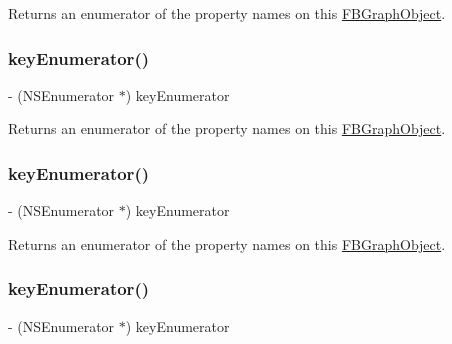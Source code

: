 Returns an enumerator of the property names on this {\ttfamily \hyperlink{interfaceFBGraphObject}{F\+B\+Graph\+Object}}. \mbox{\label{protocolFBGraphObject-p_a8df88c6df762bb207cea390c8ef5d048}} 
\subsubsection{\texorpdfstring{key\+Enumerator()}{keyEnumerator()}\hspace{0.1cm}{\footnotesize\ttfamily [3/5]}}
{\footnotesize\ttfamily -\/ (N\+S\+Enumerator $\ast$) key\+Enumerator \begin{DoxyParamCaption}{ }\end{DoxyParamCaption}}

Returns an enumerator of the property names on this {\ttfamily \hyperlink{interfaceFBGraphObject}{F\+B\+Graph\+Object}}. \mbox{\label{protocolFBGraphObject-p_a8df88c6df762bb207cea390c8ef5d048}} 
\subsubsection{\texorpdfstring{key\+Enumerator()}{keyEnumerator()}\hspace{0.1cm}{\footnotesize\ttfamily [4/5]}}
{\footnotesize\ttfamily -\/ (N\+S\+Enumerator $\ast$) key\+Enumerator \begin{DoxyParamCaption}{ }\end{DoxyParamCaption}}

Returns an enumerator of the property names on this {\ttfamily \hyperlink{interfaceFBGraphObject}{F\+B\+Graph\+Object}}. \mbox{\label{protocolFBGraphObject-p_a8df88c6df762bb207cea390c8ef5d048}} 
\subsubsection{\texorpdfstring{key\+Enumerator()}{keyEnumerator()}\hspace{0.1cm}{\footnotesize\ttfamily [5/5]}}
{\footnotesize\ttfamily -\/ (N\+S\+Enumerator $\ast$) key\+Enumerator \begin{DoxyParamCaption}{ }\end{DoxyParamCaption}}

